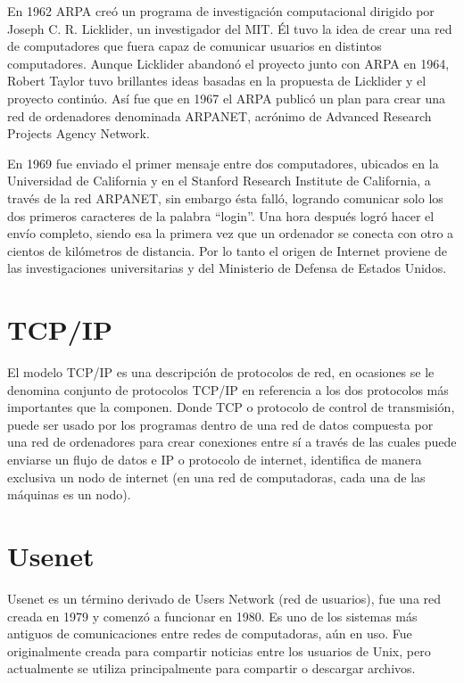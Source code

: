 \documentclass[letterpaper, 10 pt, conference]{ieeeconf}  %
\begin{document}
En 1962 ARPA creó un programa de investigación computacional dirigido por Joseph C. R. Licklider, un investigador del MIT. Él tuvo la idea de crear una red de computadores que fuera capaz de comunicar usuarios en distintos computadores. Aunque Licklider abandonó el proyecto junto con ARPA en 1964, Robert Taylor tuvo brillantes ideas basadas en la propuesta de Licklider y el proyecto continúo. Así fue que en 1967 el ARPA publicó un plan para crear una red de ordenadores denominada ARPANET, acrónimo de Advanced Research Projects Agency Network.

En 1969 fue enviado el primer mensaje entre dos computadores, ubicados en la Universidad de California y en el Stanford Research Institute de California, a través de la red ARPANET, sin embargo ésta falló, logrando comunicar solo los dos primeros caracteres de la palabra “login”. Una hora después logró hacer el envío completo, siendo esa la primera vez que un ordenador se conecta con otro a cientos de kilómetros de distancia. Por lo tanto el origen de Internet proviene de las investigaciones universitarias y del Ministerio de Defensa de Estados Unidos.

\section{TCP/IP}

El modelo TCP/IP es una descripción de protocolos de red, en ocasiones se le denomina conjunto de protocolos TCP/IP en referencia a los dos protocolos más importantes que la componen. Donde TCP o protocolo de control de transmisión, puede ser usado por los programas dentro de una red de datos compuesta por una red de ordenadores para crear conexiones entre sí a través de las cuales puede enviarse un flujo de datos e IP o protocolo de internet, identifica de manera exclusiva un nodo de internet (en una red de computadoras, cada una de las máquinas es un nodo). 

\section{Usenet}

Usenet es un término derivado de Users Network (red de usuarios), fue una red creada en 1979 y comenzó a funcionar en 1980. Es uno de los sistemas más antiguos de comunicaciones entre redes de computadoras, aún en uso. Fue originalmente creada para compartir noticias entre los usuarios de Unix, pero actualmente se utiliza principalmente para compartir o descargar archivos. 
\end{document}
